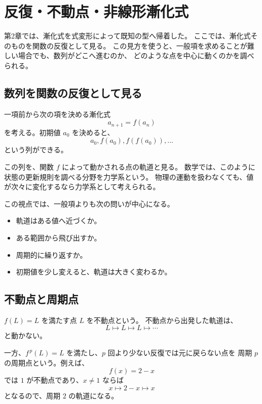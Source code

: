 
\section{反復・不動点・非線形漸化式}

第2章では、漸化式を式変形によって既知の型へ帰着した。
ここでは、漸化式そのものを関数の反復として見る。
この見方を使うと、一般項を求めることが難しい場合でも、数列がどこへ進むのか、
どのような点を中心に動くのかを調べられる。

\subsection{数列を関数の反復として見る}

一項前から次の項を決める漸化式
\[
  a_{n+1}=f(a_n)
\]
を考える。初期値 $a_0$ を決めると、
\[
  a_0, f(a_0), f(f(a_0)),\ldots
\]
という列ができる。

この列を、関数 $f$ によって動かされる点の軌道と見る。
数学では、このように状態の更新規則を調べる分野を力学系という。
物理の運動を扱わなくても、値が次々に変化するなら力学系として考えられる。

この視点では、一般項よりも次の問いが中心になる。

\begin{itemize}
  \item 軌道はある値へ近づくか。
  \item ある範囲から飛び出すか。
  \item 周期的に繰り返すか。
  \item 初期値を少し変えると、軌道は大きく変わるか。
\end{itemize}

\subsection{不動点と周期点}

$f(L)=L$ を満たす点 $L$ を不動点という。
不動点から出発した軌道は、
\[
  L\longmapsto L\longmapsto L\longmapsto\cdots
\]
と動かない。

一方、$f^{\,p}(L)=L$ を満たし、$p$ 回より少ない反復では元に戻らない点を
周期 $p$ の周期点という。例えば、
\[
  f(x)=2-x
\]
では $1$ が不動点であり、$x\neq1$ ならば
\[
  x\longmapsto 2-x\longmapsto x
\]
となるので、周期 $2$ の軌道になる。


